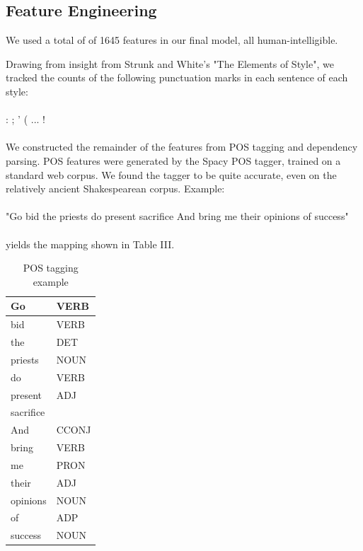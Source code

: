 \documentclass[letterpaper, 10 pt, conference]{ieeeconf}  %
\begin{document}
\subsection{Feature Engineering}
We used a total of of 1645 features in our final model, all human-intelligible.

Drawing from insight from Strunk and White's "The Elements of Style", we tracked the counts of the following punctuation marks in each sentence of each style: 
\\
\\
 : ; ' ( ... !
\\
\\
We constructed the remainder of the features from POS tagging and dependency parsing.
POS features were generated by the Spacy POS tagger, trained on a standard web corpus. We found the tagger to be quite accurate, even on the relatively ancient Shakespearean corpus. Example:\\
\\
"Go bid the priests do present sacrifice And bring me their opinions of success"\\
\\
yields the mapping shown in Table III.
\\
\begin{table}[h]
  \caption{POS tagging example}
  \label{table_example}
  \begin{center}
    \begin{tabular}{| p{2cm}  | p{2cm} | }
      \hline
      Go&VERB  \\  
      \hline
      bid&VERB\\ 
      \hline
      the&DET   \\
      \hline
      priests&NOUN \\
      \hline
      do&VERB   \\
      \hline
      present&ADJ  \\
      \hline
      sacrifice&\\
      \hline
      And&CCONJ \\
      \hline
      bring&VERB  \\
      \hline
      me&PRON   \\
      \hline
      their&ADJ    \\
      \hline
      opinions&NOUN  \\
      \hline
      of&ADP    \\
      \hline
      success&NOUN \\
      \hline
    \end{tabular}
  \end{center}
\end{table}
\end{document}
